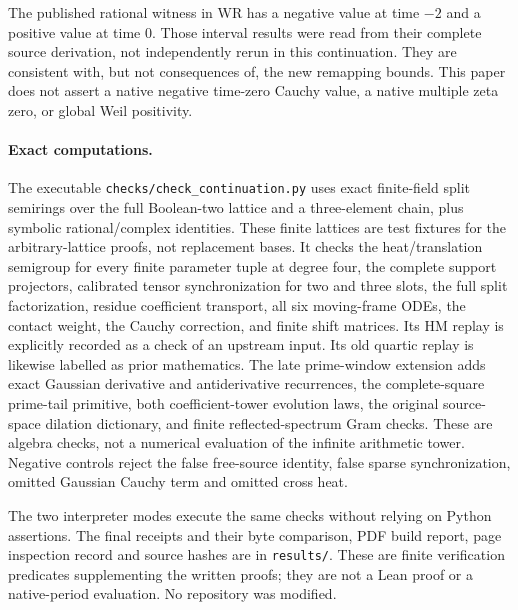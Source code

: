 \documentclass[11pt,a4paper]{article}
\theoremstyle{definition}\newtheorem{definition}[theorem]{Definition}
\begin{document}
The published rational witness in WR has a negative value at time $-2$ and a positive value at time $0$. Those interval results were read from their complete source derivation, not independently rerun in this continuation. They are consistent with, but not consequences of, the new remapping bounds. This paper does not assert a native negative time-zero Cauchy value, a native multiple zeta zero, or global Weil positivity.

\paragraph{Exact computations.}
The executable \texttt{checks/check\_continuation.py} uses exact finite-field split semirings over the full Boolean-two lattice and a three-element chain, plus symbolic rational/complex identities. These finite lattices are test fixtures for the arbitrary-lattice proofs, not replacement bases. It checks the heat/translation semigroup for every finite parameter tuple at degree four, the complete support projectors, calibrated tensor synchronization for two and three slots, the full split factorization, residue coefficient transport, all six moving-frame ODEs, the contact weight, the Cauchy correction, and finite shift matrices. Its HM replay is explicitly recorded as a check of an upstream input. Its old quartic replay is likewise labelled as prior mathematics. The late prime-window extension adds exact Gaussian derivative and antiderivative recurrences, the complete-square prime-tail primitive, both coefficient-tower evolution laws, the original source-space dilation dictionary, and finite reflected-spectrum Gram checks. These are algebra checks, not a numerical evaluation of the infinite arithmetic tower. Negative controls reject the false free-source identity, false sparse synchronization, omitted Gaussian Cauchy term and omitted cross heat.

The two interpreter modes execute the same checks without relying on Python assertions. The final receipts and their byte comparison, PDF build report, page inspection record and source hashes are in \texttt{results/}. These are finite verification predicates supplementing the written proofs; they are not a Lean proof or a native-period evaluation. No repository was modified.
\end{document}
